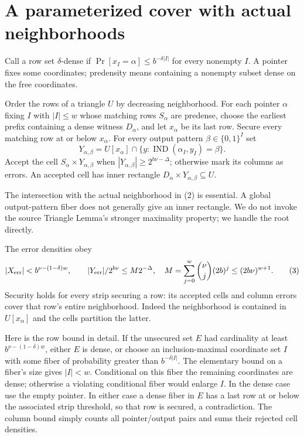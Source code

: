 \documentclass[11pt]{article}
\newcommand{\IND}{\operatorname{IND}}
\begin{document}
\section{A parameterized cover with actual neighborhoods}
Call a row set $\delta$-dense if
$\Pr[x_I=\alpha]\le b^{-\delta|I|}$ for every nonempty $I$.
A pointer fixes some coordinates; predensity means containing a nonempty
subset dense on the free coordinates.

Order the rows of a triangle $U$ by decreasing neighborhood. For each
pointer $\alpha$ fixing $I$ with $|I|\le w$ whose matching rows $S_\alpha$
are predense, choose the earliest prefix containing a dense witness
$D_\alpha$, and let $x_\alpha$ be its last row. Secure every matching row
at or below $x_\alpha$. For every output pattern $\beta\in\{0,1\}^I$ set
\[
 Y_{\alpha,\beta}=U[x_\alpha]\cap
       \{y:\IND(\alpha_I,y_I)=\beta\}.                       \tag{2}
\]
Accept the cell $S_\alpha\times Y_{\alpha,\beta}$ when
$|Y_{\alpha,\beta}|\ge2^{b\nu-\Delta}$; otherwise mark its columns as
errors. An accepted cell has inner rectangle
$D_\alpha\times Y_{\alpha,\beta}\subseteq U$.

The intersection with the actual neighborhood in (2) is essential.
A global output-pattern fiber does not generally give an inner rectangle.
We do not invoke the source Triangle Lemma's stronger maximality property;
we handle the root directly.

The error densities obey
\[
 |X_{\rm err}|<b^{\nu-(1-\delta)w},\qquad
 |Y_{\rm err}|/2^{b\nu}\le M2^{-\Delta},\quad
 M=\sum_{j=0}^w\binom\nu j(2b)^j\le(2b\nu)^{w+1}.             \tag{3}
\]
Security holds for every strip securing a row: its accepted cells and column
errors cover that row's entire neighborhood. Indeed the neighborhood is
contained in $U[x_\alpha]$ and the cells partition the latter.

Here is the row bound in detail. If the unsecured set $E$ had cardinality at
least $b^{\nu-(1-\delta)w}$, either $E$ is dense, or choose an
inclusion-maximal coordinate set $I$ with some fiber of probability greater
than $b^{-\delta|I|}$. The elementary bound on a fiber's size gives
$|I|<w$. Conditional on this fiber the remaining coordinates are dense;
otherwise a violating conditional fiber would enlarge $I$. In the dense
case use the empty pointer. In either case a dense fiber in $E$ has a last
row at or below the associated strip threshold, so that row is secured, a
contradiction. The column bound simply counts all pointer/output pairs and
sums their rejected cell densities.
\end{document}
